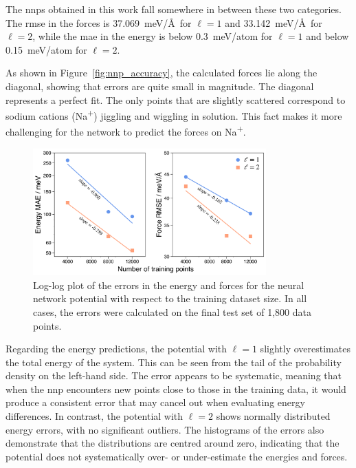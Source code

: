 The \acp{nnp} obtained in this work fall somewhere in between these two categories. The \ac{rmse} in the forces is 37.069~meV/\AA\ for $\ell=1$ and 33.142~meV/\AA\ for $\ell=2$, while the \ac{mae} in the energy is below 0.3~meV/atom for $\ell=1$ and below 0.15~meV/atom for $\ell=2$.

As shown in Figure~\ref{fig:nnp_accuracy}, the calculated forces lie along the diagonal, showing that errors are quite small in magnitude. The diagonal represents a perfect fit. The only points that are slightly scattered correspond to sodium cations (Na\textsuperscript{+}) jiggling and wiggling in solution. This fact makes it more challenging for the network to predict the forces on Na\textsuperscript{+}.

\begin{figure}[t!]
    \centering
    \includegraphics[width=0.8\textwidth]{Figures/4_Results/results_nnp_loglog_energy_force.png}
    \caption{Log-log plot of the errors in the energy and forces for the neural network potential with respect to the training dataset size. In all cases, the errors were calculated on the final test set of 1,800 data points.}
    \label{fig:nnp_log-log}
\end{figure}

Regarding the energy predictions, the potential with $\ell=1$ slightly overestimates the total energy of the system. This can be seen from the tail of the probability density on the left-hand side. The error appears to be systematic, meaning that when the \ac{nnp} encounters new points close to those in the training data, it would produce a consistent error that may cancel out when evaluating energy differences. In contrast, the potential with $\ell=2$ shows normally distributed energy errors, with no significant outliers. The histograms of the errors also demonstrate that the distributions are centred around zero, indicating that the potential does not systematically over- or under-estimate the energies and forces.

